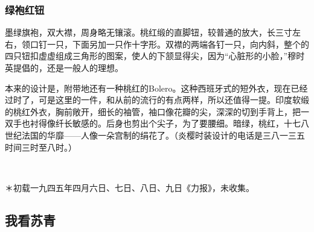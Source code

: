 \subsubsection*{绿袍红钮}
\par 墨绿旗袍，双大襟，周身略无镶滚。桃红缎的直脚钮，较普通的放大，长三寸左右，领口钉一只，下面另加一只作十字形。双襟的两端各钉一只，向内斜，整个的四只钮扣虚虚组成三角形的图案，使人的下颔显得尖，因为“心脏形的小脸，”穆时英提倡的，还是一般人的理想。
\par 本来的设计是，附带地还有一种桃红的Bolero。这种西班牙式的短外衣，现在已经过时了，可是这里的一件，和从前的流行的有点两样，所以还值得一提。印度软缎的桃红外衣，胸前敞开，细长的袖管，袖口像花瓣的尖，深深的切到手背上，把一双手也衬得像纤长敏感的。后身也剪出个尖子，为了要腰细。暗绿，桃红，十七八世纪法国的华靡——人像一朵宫制的绢花了。（炎樱时装设计的电话是三八一三五 时间三时至八时。）
\par  
\par ＊初载一九四五年四月六日、七日、八日、九日《力报》，未收集。


\subsection{我看苏青}

